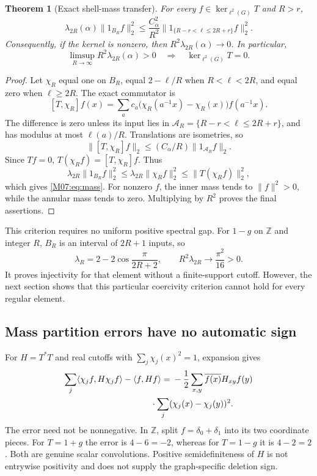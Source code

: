 \documentclass[11pt,a4paper,oneside]{report}
\newtheorem{theorem}{Theorem}[section]
\theoremstyle{definition}
\theoremstyle{remark}
\newcommand{\Z}{\mathbb Z}
\begin{document}
\begin{theorem}[Exact shell-mass transfer]\label{M07:thm:mass}
For every $f\in\ker_{\ell^2(G)}T$ and $R>r$,
\begin{equation}\label{M07:eq:mass}
\boxed{
\lambda_{2R}(\alpha)\|1_{B_R}f\|_2^2
\le\frac{C_\alpha^2}{R^2}
\|1_{\{R-r<\ell\le2R+r\}}f\|_2^2.}
\end{equation}
Consequently, if the kernel is nonzero, then
$R^2\lambda_{2R}(\alpha)\to0$. In particular,
\begin{equation}\label{M07:eq:criterion}
\limsup_{R\to\infty}R^2\lambda_{2R}(\alpha)>0
\quad\Longrightarrow\quad \ker_{\ell^2(G)}T=0.
\end{equation}
\end{theorem}
\begin{proof}
Let $\chi_R$ equal one on $B_R$, equal $2-\ell/R$ when
$R<\ell<2R$, and equal zero when $\ell\ge2R$. The exact
commutator is
\[
[T,\chi_R]f(x)=\sum_a c_a
\bigl(\chi_R(a^{-1}x)-\chi_R(x)\bigr)f(a^{-1}x).
\]
The difference is zero unless its input lies in
$\mathcal A_R=\{R-r<\ell\le2R+r\}$, and has modulus at
most $\ell(a)/R$. Translations are isometries, so
\[
\|[T,\chi_R]f\|_2\le(C_\alpha/R)\|1_{\mathcal A_R}f\|_2.
\]
Since $Tf=0$, $T(\chi_R f)=[T,\chi_R]f$. Thus
\[
\lambda_{2R}\|1_{B_R}f\|_2^2
\le\lambda_{2R}\|\chi_R f\|_2^2
\le\|T(\chi_R f)\|_2^2,
\]
which gives \eqref{M07:eq:mass}. For nonzero $f$, the inner mass
tends to $\|f\|^2>0$, while the annular mass tends to zero.
Multiplying by $R^2$ proves the final assertions.
\end{proof}

This criterion requires no uniform positive spectral gap.
For $1-g$ on $\Z$ and integer $R$, $B_R$ is an interval of $2R+1$ inputs,
so
\[
\lambda_R=2-2\cos\frac\pi{2R+2},\qquad
R^2\lambda_{2R}\longrightarrow\frac{\pi^2}{16}>0.
\]
It proves injectivity for that element without a finite-support
cutoff. However, the next section shows that this particular
coercivity criterion cannot hold for every regular element.

\subsection{Mass partition errors have no automatic sign}

For $H=T^*T$ and real cutoffs with $\sum_j\chi_j(x)^2=1$,
expansion gives
\begin{align*}
\sum_j\langle\chi_j f,H\chi_j f\rangle-\langle f,Hf\rangle
={}&-\frac12\sum_{x,y}\overline{f(x)}H_{xy}f(y)\\
&\hspace{-9mm}\cdot\sum_j(\chi_j(x)-\chi_j(y))^2.
\end{align*}
The error need not be nonnegative. In $\Z$, split
$f=\delta_0+\delta_1$ into its two coordinate pieces.
For $T=1+g$ the error is $4-6=-2$, whereas for $T=1-g$
it is $4-2=2$. Both are genuine scalar convolutions.
Positive semidefiniteness of $H$ is not entrywise positivity
and does not supply the graph-specific deletion sign.
\end{document}
